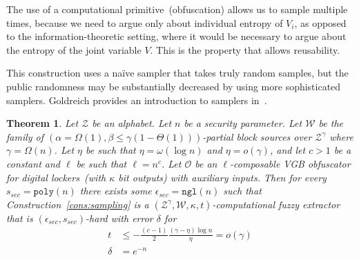 \documentclass[11pt]{article}
\newcommand{\consref}[1]{\mbox{Construction~\ref{#1}}}
\newcommand{\poly}{\ensuremath{\mathtt{poly}}\xspace}
\newcommand{\ngl}{\ensuremath{\mathtt{ngl}}\xspace}
\newcommand{\Huse}{\mathrm{H}_{\mathtt{usable}}}
\newtheorem{theorem}{Theorem}[section]
\begin{document}
\noindent
The use of a computational primitive~(obfuscation) allows us to sample multiple times, because we need to argue only about individual entropy of $V_i$, as opposed to the information-theoretic setting, where it would be necessary to argue about the entropy of the joint variable $V$.  This is the property that allows reusability.

This construction uses a na\"{i}ve sampler that takes truly random samples, but the public randomness may be substantially decreased by using more sophisticated samplers. Goldreich provides an introduction to samplers in~\cite{goldreich2011sample}.

\begin{theorem}
\label{thm:sampling}
Let $\mathcal{Z}$ be an alphabet.  Let $n$ be a security parameter.  Let $\mathcal{W}$ be the family of $(\alpha = \Omega(1), \beta\leq \gamma(1-\Theta(1)))$-partial block sources over $\mathcal{Z}^\gamma$ where $\gamma =\Omega(n)$.  Let $\eta$ be such that $\eta = \omega(\log n)$ and $\eta = o(\gamma)$, and let $c> 1$ be a constant and $\ell$ be such that $\ell = n^c$.  Let $\mathcal{O}$ be an $\ell$-composable VGB obfuscator for digital lockers~(with $\kappa$ bit outputs) with auxiliary inputs.  Then for every $s_{sec} = \poly(n)$ there exists some $\epsilon_{sec} = \ngl(n)$ such that \consref{cons:sampling} is a $(\mathcal{Z}^\gamma, \mathcal{W}, \kappa, t)$-computational fuzzy extractor that is $(\epsilon_{sec}, s_{sec})$-hard with error $\delta$ for
\begin{align*}
t&\leq -\frac{(c-1)}{2} \frac{(\gamma-\eta)\log n}{\eta} = o(\gamma)\\
\delta &= e^{-n}
\end{align*}
\end{theorem}
\end{document}
